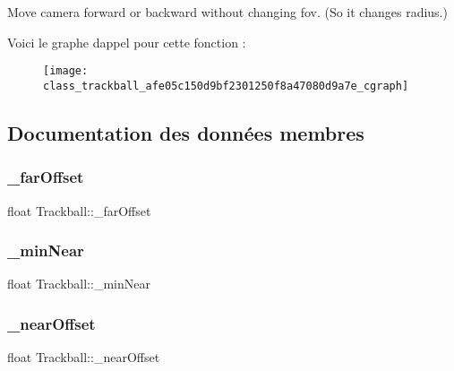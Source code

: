 Move camera forward or backward without changing fov. (So it changes radius.) 

Voici le graphe d\textquotesingle{}appel pour cette fonction \+:\nopagebreak
\begin{figure}[H]
\begin{center}
\leavevmode
\texttt{[image: class\_trackball\_afe05c150d9bf2301250f8a47080d9a7e\_cgraph]}
\end{center}
\end{figure}


\subsection{Documentation des données membres}
\mbox{\label{class_trackball_aafee1403bc2961498e3df496b787679a}} 
\subsubsection{\texorpdfstring{\+\_\+far\+Offset}{\_farOffset}}
{\footnotesize\ttfamily float Trackball\+::\+\_\+far\+Offset\hspace{0.3cm}{\ttfamily [private]}}

\mbox{\label{class_trackball_a9130004320d2ebca9aee340403513f41}} 
\subsubsection{\texorpdfstring{\+\_\+min\+Near}{\_minNear}}
{\footnotesize\ttfamily float Trackball\+::\+\_\+min\+Near\hspace{0.3cm}{\ttfamily [private]}}

\mbox{\label{class_trackball_a08e3d5e8358c166c29d015f36c998bd1}} 
\subsubsection{\texorpdfstring{\+\_\+near\+Offset}{\_nearOffset}}
{\footnotesize\ttfamily float Trackball\+::\+\_\+near\+Offset\hspace{0.3cm}{\ttfamily [private]}}


